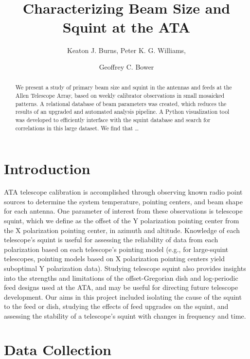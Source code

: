 \documentclass[preprint]{aastex}
\begin{document}
\title{Characterizing Beam Size and Squint at the ATA}
\author{Keaton J. Burns, Peter K. G. Williams, \and Geoffrey C. Bower}

\begin{abstract}
We present a study of primary beam size and squint in the antennas and
feeds at the Allen Telescope Array, based on weekly calibrator
observations in small mosaicked patterns. A relational database of
beam parameters was created, which reduces the results of an upgraded
and automated analysis pipeline.  A Python visualization tool was
developed to efficiently interface with the squint database and search
for correlations in this large dataset.  We find that \ldots
\end{abstract}


\section{Introduction}\label{s.intro}
ATA telescope calibration is accomplished through observing known
radio point sources to determine the system temperature, pointing
centers, and beam shape for each antenna.  One parameter of interest
from these observations is telescope squint, which we define as the
offset of the Y polarization pointing center from the X polarization
pointing center, in azimuth and altitude.  Knowledge of each
telescope's squint is useful for assessing the reliability of data
from each polarization based on each telescope's pointing model
(e.g., for large-squint telescopes, pointing models based on X
polarization pointing centers yield suboptimal Y polarization
data). Studying telescope squint also provides insights into the
strengths and limitations of the offset-Gregorian dish and
log-periodic feed designs used at the ATA, and may be useful for
directing future telescope development.  Our aims in this project
included isolating the cause of the squint to the feed or dish,
studying the effects of feed upgrades on the squint, and assessing the
stability of a telescope's squint with changes in frequency and time.


\section{Data Collection}\label{s.datacollection}
\end{document}
